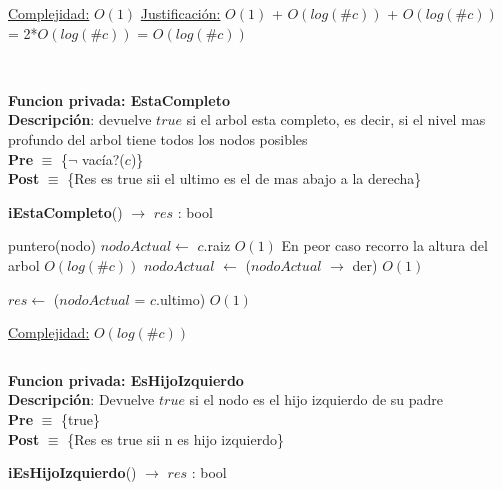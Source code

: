 \begin{Algoritmos}
\begin{algorithm}[H]
\begin{algorithmic}[1]
    \medskip
    \Statex \underline{Complejidad:} $O(1)$
    \Statex \underline{Justificaci\'on:} $O(1)$ + $O(log(\#c))$ + $O(log(\#c))$ = 2*$O(log(\#c))$ = $O(log(\#c))$
\end{algorithmic}
\end{algorithm}






$ $\newline
$ $\newline

\textbf{Funcion privada: EstaCompleto}\\
\textbf{Descripci\'on}: devuelve $true$ si el arbol esta completo, es decir, si el nivel mas profundo del arbol tiene todos los nodos posibles\\
\textbf{Pre} $\equiv$ \{$\neg$ vac\'ia?($c$)\}\\%
\textbf{Post} $\equiv$ \{Res es true sii el ultimo es el de mas abajo a la derecha\}%
\begin{algorithm}[H]
{\textbf{iEstaCompleto}() $\to$ $res$ : bool}
\begin{algorithmic}[1]

    \State puntero(nodo) $nodoActual \gets$ $c$.raiz \Comment $O(1)$
     \Comment En peor caso recorro la altura del arbol $O(log(\#c))$
        \State $nodoActual$ $\gets$ ($nodoActual$ $\rightarrow$ der) \Comment $O(1)$
    \EndWhile

    \State $res \gets$ ($nodoActual$ = $c$.ultimo) \Comment $O(1)$

    \medskip
    \Statex \underline{Complejidad:} $O(log(\#c))$
\end{algorithmic}
\end{algorithm}


$ $\newline

\textbf{Funcion privada: EsHijoIzquierdo}\\
\textbf{Descripci\'on}: Devuelve $true$ si el nodo es el hijo izquierdo de su padre\\
\textbf{Pre} $\equiv$ \{true\}\\%
\textbf{Post} $\equiv$ \{Res es true sii n es hijo izquierdo\}%
\begin{algorithm}[H]
{\textbf{iEsHijoIzquierdo}() $\to$ $res$ : bool}
\begin{algorithmic}[1]
    

\end{algorithmic}
\end{algorithm}
\end{Algoritmos}
